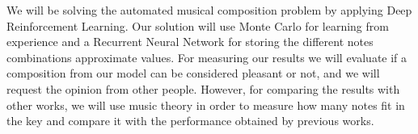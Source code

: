 We will be solving the automated musical composition problem by applying Deep Reinforcement Learning. Our solution will use Monte Carlo for learning from experience and a Recurrent Neural Network for storing the different notes combinations approximate values. For measuring our results we will evaluate if a composition from our model can be considered pleasant or not, and we will request the opinion from other people. However, for comparing the results with other works, we will use music theory in order to measure how many notes fit in the key and compare it with the performance obtained by previous works.